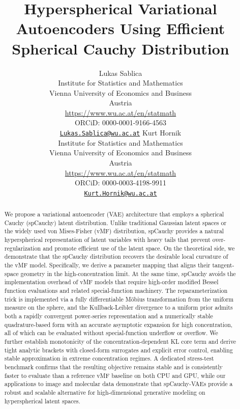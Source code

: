 \documentclass{article}
\title{Hyperspherical Variational Autoencoders Using Efficient Spherical Cauchy Distribution}
\author{
  Lukas Sablica \\
  Institute for Statistics and Mathematics\\
  Vienna University of Economics and Business\\
  Austria\\
  \url{https://www.wu.ac.at/en/statmath}\\
  ORCiD: 0000-0001-9166-4563\\
  \href{mailto:Lukas.Sablica@wu.ac.at}{\nolinkurl{Lukas.Sablica@wu.ac.at}}
   \And
 Kurt Hornik\\
Institute for Statistics and Mathematics\\
Vienna University of Economics and Business\\
Austria\\
\url{https://www.wu.ac.at/en/statmath}\\
ORCiD: 0000-0003-4198-9911\\
\href{mailto:Kurt.Hornik@wu.ac.at}{\nolinkurl{Kurt.Hornik@wu.ac.at}}
}
\begin{document}
\maketitle

\begin{abstract}
We propose a variational autoencoder (VAE) architecture that employs a spherical Cauchy (spCauchy) latent distribution. Unlike traditional Gaussian latent spaces or the widely used von Mises-Fisher (vMF) distribution, spCauchy provides a natural hyperspherical representation of latent variables with heavy tails that prevent over-regularization and promote efficient use of the latent space. On the theoretical side, we demonstrate that the spCauchy distribution recovers the desirable local curvature of the vMF model. Specifically, we derive a parameter mapping that aligns their tangent-space geometry in the high-concentration limit. At the same time, spCauchy avoids the implementation overhead of vMF models that require high-order modified Bessel function evaluations and related special-function machinery. The reparameterization trick is implemented via a fully differentiable Möbius transformation from the uniform measure on the sphere, and the Kullback-Leibler divergence to a uniform prior admits both a rapidly convergent power-series representation and a numerically stable quadrature-based form with an accurate asymptotic expansion for high concentration, all of which can be evaluated without special-function underflow or overflow. We further establish monotonicity of the concentration-dependent KL core term and derive tight analytic brackets with closed-form surrogates and explicit error control, enabling stable approximation in extreme concentration regimes. A dedicated stress-test benchmark confirms that the resulting objective remains stable and is consistently faster to evaluate than a reference vMF baseline on both CPU and GPU, while our applications to image and molecular data demonstrate that spCauchy-VAEs provide a robust and scalable alternative for high-dimensional generative modeling on hyperspherical latent spaces.
\end{abstract}



\end{document}

